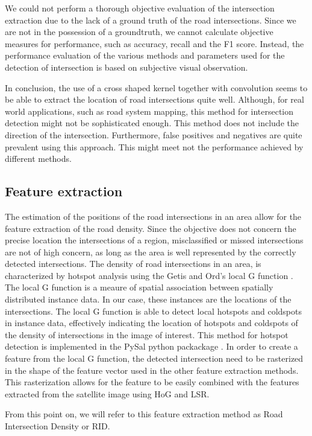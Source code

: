 We could not perform a thorough objective evaluation of the intersection extraction due to the lack of a ground truth of the road intersections. Since we are not in the possession of a groundtruth, we cannot calculate objective measures for performance, such as accuracy, recall and the F1 score. Instead, the performance evaluation of the various methods and parameters used for the detection of intersection is based on subjective visual observation.

In conclusion, the use of a cross shaped kernel together with convolution seems to be able to extract the location of road intersections quite well. Although, for real world applications, such as road system mapping, this method for intersection detection might not be sophisticated enough. This method does not include the direction of the intersection. Furthermore, false positives and negatives are quite prevalent using this approach. This might meet not the performance achieved by different methods.

\subsection{Feature extraction}

The estimation of the positions of the road intersections in an area allow for the
feature extraction of the road density. Since the objective does not concern the
precise location the intersections of a region, misclassified or missed intersections are not of high concern, as long as the area is well represented by the correctly detected intersections. The density of road intersections in an area, is characterized by hotspot analysis using the Getis and Ord's local G function \cite{getis1992analysis}. The local G function is a meaure of spatial association between spatially distributed instance data. In our case, these instances are the locations of the intersections. The local G function is able to detect local hotspots and coldspots in instance data, effectively indicating the location of hotspots and coldspots of the density of intersections in the image of interest. This method for hotspot detection is implemented in the PySal python packackage \cite{rey2010pysal}. In order to create a feature from the local G function, the detected intersection need to be rasterized in the shape of the feature vector used in the other feature extraction methods. This rasterization allows for the feature to be easily combined with the features extracted from the satellite image using HoG and LSR.

From this point on, we will refer to this feature extraction method as Road Intersection Density or RID.




